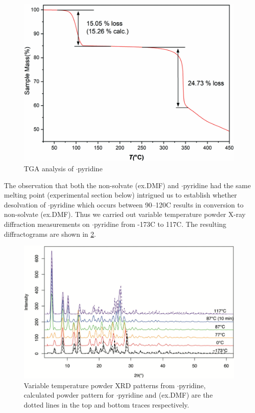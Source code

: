 \begin{figure}
    \centering
    \includegraphics[width=0.8\linewidth]{Figures/tga.png}
    \caption{TGA analysis of $\cdot$pyridine}
    \label{fig:tga}
\end{figure}

The observation that both the non-solvate (ex.DMF) and $\cdot$pyridine had the same melting point (experimental section below) intrigued us to establish whether desolvation of $\cdot$pyridine which occurs between 90--120\degree C results in conversion to non-solvate (ex.DMF). 
Thus we carried out variable temperature powder X-ray diffraction measurements on $\cdot$pyridine from -173\degree C to 117\degree C.
The resulting diffractograms are shown in \ref{fig:vt-pdx}.

\begin{figure}
    \centering
    \includegraphics[width=\linewidth]{Figures/vt-pdx.png}
    \caption[Variable temperature powder XRD patterns from $\cdot$pyridine]{Variable temperature powder XRD patterns from $\cdot$pyridine, calculated powder pattern for $\cdot$pyridine and (ex.DMF) are the dotted lines in the top and bottom traces respectively.}
    \label{fig:vt-pdx}
\end{figure}

